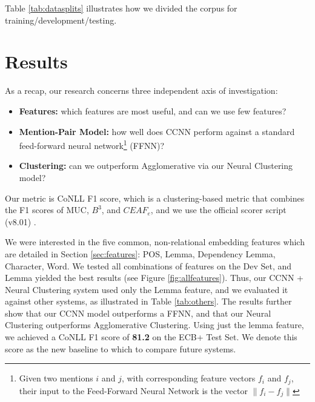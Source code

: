 \documentclass[11pt,a4paper]{article}
\begin{document}
Table \ref{tab:datasplits} illustrates how we divided the corpus for training/development/testing.


\section{Results}
As a recap, our research concerns three independent axis of investigation:
\begin{itemize}
\item \textbf{Features:} which features are most useful, and can we use few features?
\item \textbf{Mention-Pair Model:} how well does CCNN perform against a standard feed-forward neural network\footnote{Given two mentions $i$ and $j$, with corresponding feature vectors $f_i$ and $f_j$, their input to the Feed-Forward Neural Network is the vector $\|f_{i} - f_{j}\|$} (FFNN)?
\item \textbf{Clustering:} can we outperform Agglomerative via our Neural Clustering model?
\end{itemize}

Our metric is CoNLL F1 score, which is a clustering-based metric that combines the F1 scores of MUC, $B^{3}$, and $CEAF_{e}$, and we use the official scorer script (v8.01) \cite{Pradhan+etal:14a}.

We were interested in the five common, non-relational embedding features which are detailed in Section \ref{sec:features}: POS, Lemma, Dependency Lemma, Character, Word.  We tested all combinations of features on the Dev Set, and Lemma yielded the best results (see Figure \ref{fig:allfeatures}).  Thus, our CCNN + Neural Clustering system used only the Lemma feature, and we evaluated it against other systems, as illustrated in Table \ref{tab:others}.  The results further show that our CCNN model outperforms a FFNN, and that our Neural Clustering outperforms Agglomerative Clustering.  Using just the lemma feature, we achieved a CoNLL F1 score of \textbf{81.2} on the ECB+ Test Set.  We denote this score as the new baseline to which to compare future systems.
\end{document}
